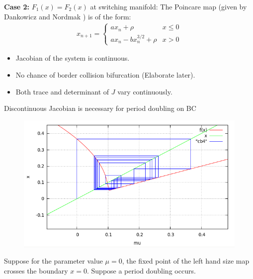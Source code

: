 \documentclass[xcolor=x11names,compress]{beamer}
\renewcommand{\(}{\begin{columns}}
\renewcommand{\)}{\end{columns}}
\newcommand{\<}[1]{\begin{column}{#1}}
\renewcommand{\>}{\end{column}}
\newcommand{\case}[1]{\textbf{Case #1:}}
\begin{document}
\begin{frame}
\case{2} $F_1(x)= F_2(x)$ at switching manifold:
The Poincare map (given by Dankowicz and Nordmak ) is of the form:
\begin{align*}
x_{n+1}=\left\{ 
\begin{array}{lr}
ax_n + \rho  &x\leq 0\\
ax_n-bx_n^{3/2}+\rho &x>0
\end{array}
\right.
\end{align*}

\begin{itemize}
\item Jacobian of the system is continuous. \\
\item No chance of border collision bifurcation (Elaborate later).  \\
\item Both trace and determinant of $J$ vary continuously.  
\end{itemize}

\vspace{4em}
\end{frame}


\begin{frame}{Discontinuous Jacobian is necessary for period doubling on BC}

\begin{figure}
\caption{}
\begin{center}
\includegraphics[height=0.4\textheight]{cb}
\end{center}
\end{figure}

Suppose for the parameter value $\mu=0$, the fixed point of the left hand size 
map crosses the boundary $x=0$.  Suppose a period doubling occurs. \\
\end{frame}
\end{document}
